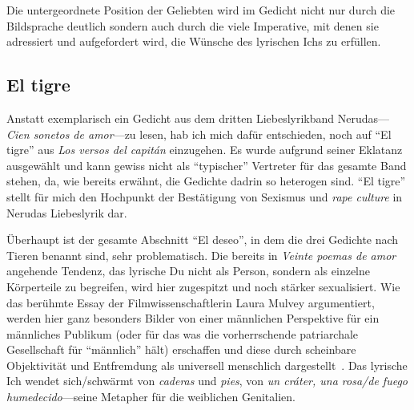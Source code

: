 Die untergeordnete Position der Geliebten wird im Gedicht nicht nur durch die Bildsprache deutlich sondern auch durch die viele Imperative, mit denen sie adressiert und aufgefordert wird, die Wünsche des lyrischen Ichs zu erfüllen.


\subsection{El tigre}

Anstatt exemplarisch ein Gedicht aus dem dritten Liebeslyrikband Nerudas—\textit{Cien sonetos de amor}—zu lesen, hab ich mich dafür entschieden, noch auf ``El tigre'' aus \textit{Los versos del capitán} einzugehen.
Es wurde aufgrund seiner Eklatanz ausgewählt und kann gewiss nicht als ``typischer'' Vertreter für das gesamte Band stehen, da, wie bereits erwähnt, die Gedichte dadrin so heterogen sind.
``El tigre'' stellt für mich den Hochpunkt der Bestätigung von Sexismus und \textit{rape culture} in Nerudas Liebeslyrik dar.

Überhaupt ist der gesamte Abschnitt ``El deseo'', in dem die drei Gedichte nach Tieren benannt sind, sehr problematisch.
Die bereits in \textit{Veinte poemas de amor} angehende Tendenz, das lyrische Du nicht als Person, sondern als einzelne Körperteile zu begreifen, wird hier zugespitzt und noch stärker sexualisiert.
Wie das berühmte Essay der Filmwissenschaftlerin Laura Mulvey argumentiert, werden hier ganz besonders Bilder von einer männlichen Perspektive für ein männliches Publikum (oder für das was die vorherrschende patriarchale Gesellschaft für ``männlich'' hält) erschaffen und diese durch scheinbare Objektivität und Entfremdung als universell menschlich dargestellt~\cite{Mulvey1975}.
Das lyrische Ich wendet sich/schwärmt von \textit{caderas} und \textit{pies}, von \textit{un cráter, una rosa/de fuego humedecido}—seine Metapher für die weiblichen Genitalien.

